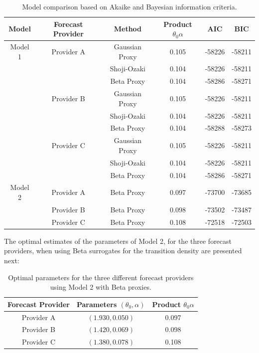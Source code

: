 \documentclass[11pt]{article}
\theoremstyle{definition}
\begin{document}
\begin{table}[H]
\centering
\begin{tabular}{cccccc}
\toprule
Model & Forecast Provider & Method & Product $\theta_0\alpha$   & AIC & BIC \\ \midrule
Model 1 & Provider A & Gaussian Proxy & 0.105 & -58226 & -58211 \\
 &  & Shoji-Ozaki & 0.104 & -58226 & -58211 \\
 &  & Beta Proxy & 0.104 & -58286 & -58271 \\
 & Provider B & Gaussian Proxy & 0.105 & -58226   & -58211 \\
 &  & Shoji-Ozaki & 0.104 & -58226 & -58211 \\
 &  & Beta Proxy & 0.104 & -58288 & -58273 \\
 & Provider C & Gaussian Proxy & 0.105 & -58226 & -58211 \\
 &  & Shoji-Ozaki & 0.104 & -58226 & -58211 \\
 &  & Beta Proxy & 0.104 & -58286 & -58271 \\
Model 2 & Provider A & Beta Proxy & 0.097 & -73700   & -73685 \\ 
 & Provider B & Beta Proxy & 0.098 &  -73502 & -73487 \\ 
 & Provider C & Beta Proxy & 0.108 & -72518 & -72503 \\ 
\bottomrule
\end{tabular}
\caption{Model comparison based on Akaike and Bayesian information criteria.}
\label{tab:model_comparison}
\end{table}

The optimal estimates of the parameters of Model 2, for the three forecast providers, when using Beta surrogates for the transition density are presented next:
\begin{table}[H]
\centering
\begin{tabular}{ccc}
\toprule
Forecast Provider & Parameters $(\theta_0, \alpha)$ & Product $\theta_0\alpha$ \\ \midrule
Provider A  & $(1.930,0.050)$  &  0.097 \\
Provider B  & $(1.420,0.069) $  &  0.098 \\ 
Provider C  & $(1.380,0.078) $  &  0.108 \\ 
\bottomrule
\end{tabular}
\caption{Optimal parameters for the three different forecast providers using Model 2 with Beta proxies.}
\label{tab:forcast_comparison}
\end{table}
\end{document}
